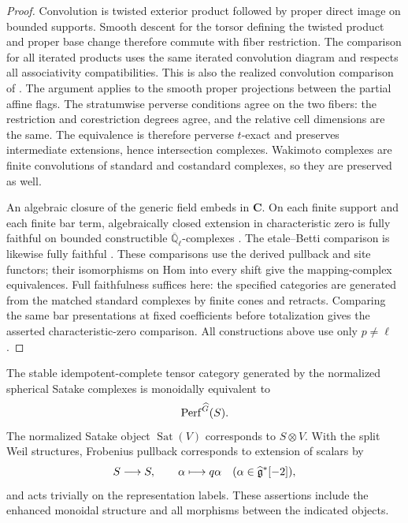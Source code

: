 \begin{proof}
Convolution is twisted exterior product followed by proper direct
image on bounded supports. Smooth descent for the torsor defining the
twisted product and proper base change therefore commute with fiber
restriction. The comparison for all iterated products uses the same
iterated convolution diagram and respects all associativity
compatibilities. This is also the realized convolution comparison of
\cite[Proposition~3.14 and Lemma~3.15]{RicharzScholbach}.
The argument applies to the smooth proper projections between the
partial affine flags. The stratumwise perverse conditions agree on
the two fibers: the restriction and corestriction degrees agree,
and the relative cell dimensions are the same. The equivalence is
therefore perverse $t$-exact and preserves intermediate extensions,
hence intersection complexes. Wakimoto complexes
are finite convolutions of standard and costandard complexes, so they
are preserved as well.

An algebraic closure of the generic field embeds in $\mathbf C$.
On each finite support and each finite bar term, algebraically closed
extension in characteristic zero is fully faithful on bounded
constructible $\overline{\mathbb Q}_\ell$-complexes
\cite[Lemma~A.1]{JKLMBaseChange}.
The etale--Betti comparison is likewise fully faithful
\cite[Corollary~3.4.3, Proposition~3.5.9, and
Remark~3.5.12]{SunComparison}. These comparisons use the derived
pullback and site functors; their isomorphisms on Hom into every shift
give the mapping-complex equivalences. Full faithfulness suffices here:
the specified categories are generated from the matched standard
complexes by finite cones and retracts. Comparing the same bar
presentations at fixed coefficients before totalization gives the
asserted characteristic-zero comparison.
All constructions above use only $p\ne\ell$.
\end{proof}

\begin{theorem}\label{cat:satake}
The stable idempotent-complete tensor category generated by the
normalized spherical Satake complexes is monoidally equivalent to
\[
 \operatorname{Perf}^{\widehat G}(S).
\]
The normalized Satake object $\operatorname{Sat}(V)$ corresponds to
$S\otimes V$. With the split Weil structures, Frobenius pullback
corresponds to extension of scalars by
\[
 S\longrightarrow S,\qquad \alpha\longmapsto q\alpha
 \quad(\alpha\in\widehat{\mathfrak g}^*[-2]),
\]
and acts trivially on the representation labels. These assertions
include the enhanced monoidal structure and all morphisms between
the indicated objects.
\end{theorem}


